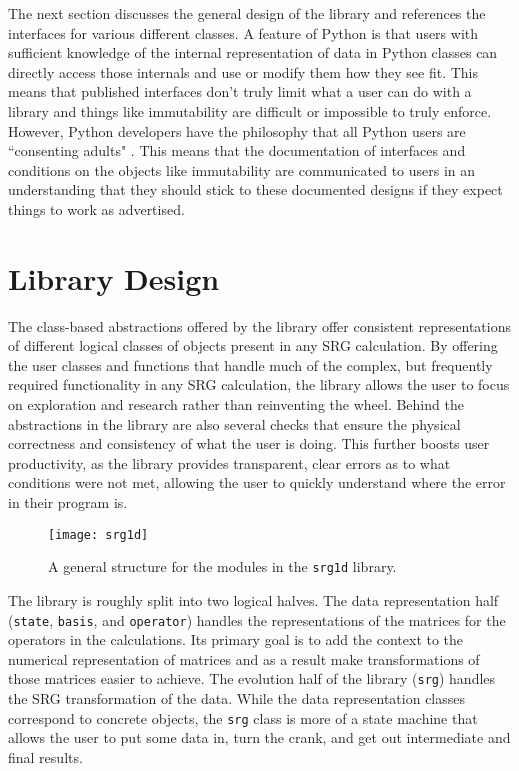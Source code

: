 The next section discusses the general design of the library and references the interfaces for various different classes. A feature of Python is that users with sufficient knowledge of the internal representation of data in Python classes can directly access those internals and use or modify them how they see fit. This means that published interfaces don't truly limit what a user can do with a library and things like immutability are difficult or impossible to truly enforce. However, Python developers have the philosophy that all Python users are ``consenting adults" \cite{consentingAdults}. This means that the documentation of interfaces and conditions on the objects like immutability are communicated to users in an understanding that they should stick to these documented designs if they expect things to work as advertised.

\section{Library Design}

The class-based abstractions offered by the library offer consistent representations of different logical classes of objects present in any SRG calculation. By offering the user classes and functions that handle much of the complex, but frequently required functionality in any SRG calculation, the library allows the user to focus on exploration and research rather than reinventing the wheel. Behind the abstractions in the library are also several checks that ensure the physical correctness and consistency of what the user is doing. This further boosts user productivity, as the library provides transparent, clear errors as to what conditions were not met, allowing the user to quickly understand where the error in their program is.

\begin{figure}[t]
\begin{center}
\texttt{[image: srg1d]}
\end{center}
\caption{A general structure for the modules in the \texttt{srg1d} library.}
\label{fig:srg1d}
\end{figure}

The library is roughly split into two logical halves. The data representation half (\texttt{state}, \texttt{basis}, and \texttt{operator}) handles the representations of the matrices for the operators in the calculations. Its primary goal is to add the context to the numerical representation of matrices and as a result make transformations of those matrices easier to achieve. The evolution half of the library (\texttt{srg}) handles the SRG transformation of the data. While the data representation classes correspond to concrete objects, the \texttt{srg} class is more of a state machine that allows the user to put some data in, turn the crank, and get out intermediate and final results.

